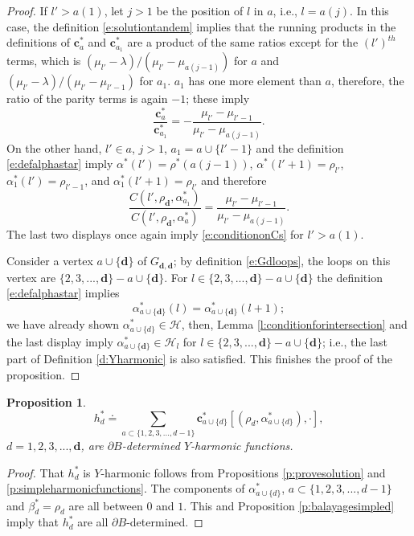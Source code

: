\documentclass[11pt,a4paper]{article}
\newtheorem{proposition}{Proposition}[section]
\begin{document}
\begin{proof}
If $l' > a(1)$, let $j>1$ be the position of $l$ in $a$, i.e., $l=a(j)$.  
In this case, the definition \eqref{e:solutiontandem} implies that
the running products in the definitions of 
${\boldsymbol c}^*_{a}$ and ${\boldsymbol c}^*_{a_1}$ 
are a product of the same ratios
except for the $(l')^{th}$ terms, 
which is $(\mu_{l'} - \lambda)/(\mu_{l'} -\mu_{a(j-1)})$ 
for $a$ and $(\mu_{l'} - \lambda)/(\mu_{l'} -\mu_{l'-1})$ for $a_1$. 
$a_1$ has
one more element than $a$, therefore, the ratio of the parity terms 
is again $-1$; these imply
\[
\frac{{\boldsymbol c}^*_{a}}{{\boldsymbol c}^*_{a_1}} = 
-\frac{ \mu_{l'}-\mu_{l'-1}}{\mu_{l'}-\mu_{a(j-1)}}.
\]
On the other hand, $l' \in a$,  $j > 1$,  
$a_1 = a \cup \{l'-1\}$ 
and the definition \eqref{e:defalphastar} imply 
$\alpha^*(l') = \rho^*(a(j-1))$, $\alpha^*(l'+1) = \rho_{l'}$, 
$\alpha_1^*(l') = \rho_{l'-1}$,
and $\alpha_1^*(l'+1) = \rho_{l'}$ and therefore 
\[
\frac{C(l',\rho_{\boldsymbol d}, \alpha^*_{a_1})}{C(l',\rho_{\boldsymbol d},\alpha^*_a)} = 
\frac{ \mu_{l'} - \mu_{l'-1}}{\mu_{l'} - \mu_{a(j-1)}}.
\]
The last two displays once again imply \eqref{e:conditiononCs} 
for $l' > a(1).$



Consider a vertex $a \cup \{ {\bm d} \}$ of $G_{{\bm d}, {\bm d}}$;
by definition \eqref{e:Gdloops}, the loops on this vertex are
$\{2,3,...,{\bm d}\} - a \cup \{{\bm d}\}.$
For $l \in \{2,3,...,{\bm d}\} - a \cup \{{\bm d}\}$
the definition \eqref{e:defalphastar}
implies 
\[
\alpha^*_{a\cup\{{\bm d}\}}(l) =  \alpha^*_{a\cup\{{\bm d}\}}(l+1);
\]
we have already shown $\alpha^*_{a\cup\{d\}} \in {\mathcal H}$,
then, Lemma \ref{l:conditionforintersection} and the last display
imply
$\alpha^*_{a\cup \{\boldsymbol d\}} \in {\mathcal H}_l$ for
$l \in \{2,3,...,{\bm d}\} - a \cup \{{\bm d}\}$;
 i.e., the last part of Definition
\ref{d:Yharmonic} is also satisfied. This finishes the proof of the
proposition.
\end{proof}


\begin{proposition}\label{p:defhd}
\begin{equation}\label{e:defhd}
h^*_d \doteq \sum_{ a \subset \{1,2,3,...,d-1\}} 
{\boldsymbol c}^*_{a\cup \{d\}} [(\rho_d, \alpha^*_{a\cup\{d\}}),\cdot],
\end{equation}
$d=1,2,3,...,{\boldsymbol d}$, are $\partial B$-determined $Y$-harmonic functions.
\end{proposition}
\begin{proof}
That $h^*_d$ is $Y$-harmonic follows from Propositions \ref{p:provesolution} 
and \ref{p:simpleharmonicfunctions}.
The components of $\alpha^*_{a\cup\{d\}}$, $a\subset
\{1,2,3,...,d-1\}$ and $\beta^*_d = \rho_d$ are all between $0$ and $1$.
This and Proposition \ref{p:balayagesimpled} imply 
that  $h^*_d$ are all $\partial B$-determined.
\end{proof}
\end{document}
